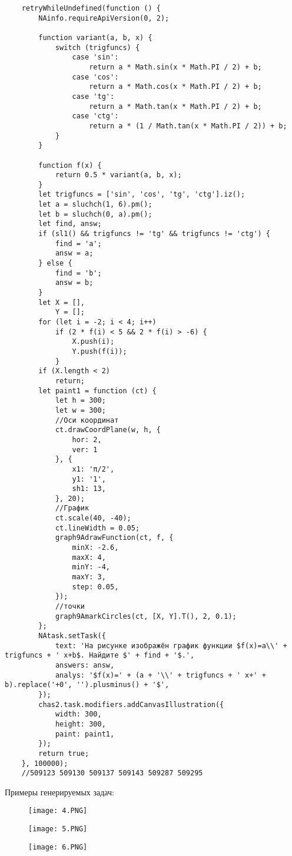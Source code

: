 \begin{lstlisting}
	retryWhileUndefined(function () {
		NAinfo.requireApiVersion(0, 2);
	
		function variant(a, b, x) {
			switch (trigfuncs) {
				case 'sin':
					return a * Math.sin(x * Math.PI / 2) + b;
				case 'cos':
					return a * Math.cos(x * Math.PI / 2) + b;
				case 'tg':
					return a * Math.tan(x * Math.PI / 2) + b;
				case 'ctg':
					return a * (1 / Math.tan(x * Math.PI / 2)) + b;
			}
		}
	
		function f(x) {
			return 0.5 * variant(a, b, x);
		}
		let trigfuncs = ['sin', 'cos', 'tg', 'ctg'].iz();
		let a = sluchch(1, 6).pm();
		let b = sluchch(0, a).pm();
		let find, answ;
		if (sl1() && trigfuncs != 'tg' && trigfuncs != 'ctg') {
			find = 'a';
			answ = a;
		} else {
			find = 'b';
			answ = b;
		}
		let X = [],
			Y = [];
		for (let i = -2; i < 4; i++)
			if (2 * f(i) < 5 && 2 * f(i) > -6) {
				X.push(i);
				Y.push(f(i));
			}
		if (X.length < 2)
			return;
		let paint1 = function (ct) {
			let h = 300;
			let w = 300;
			//Оси координат
			ct.drawCoordPlane(w, h, {
				hor: 2,
				ver: 1
			}, {
				x1: 'π/2',
				y1: '1',
				sh1: 13,
			}, 20);
			//График
			ct.scale(40, -40);
			ct.lineWidth = 0.05;
			graph9AdrawFunction(ct, f, {
				minX: -2.6,
				maxX: 4,
				minY: -4,
				maxY: 3,
				step: 0.05,
			});
			//точки
			graph9AmarkCircles(ct, [X, Y].T(), 2, 0.1);
		};
		NAtask.setTask({
			text: 'На рисунке изображён график функции $f(x)=a\\' + trigfuncs + ' x+b$. Найдите $' + find + '$.',
			answers: answ,
			analys: '$f(x)=' + (a + '\\' + trigfuncs + ' x+' + b).replace('+0', '').plusminus() + '$',
		});
		chas2.task.modifiers.addCanvasIllustration({
			width: 300,
			height: 300,
			paint: paint1,
		});
		return true;
	}, 100000);
	//509123 509130 509137 509143 509287 509295
\end{lstlisting}
\newpage
Примеры генерируемых задач:

\begin{figure}[h]
	\texttt{[image: 4.PNG]}
\end{figure}

\vspace{\baselineskip}
\begin{figure}[h]
	\texttt{[image: 5.PNG]}
\end{figure}

\vspace{\baselineskip}
\newpage
\begin{figure}[h]
	\texttt{[image: 6.PNG]}
\end{figure}
